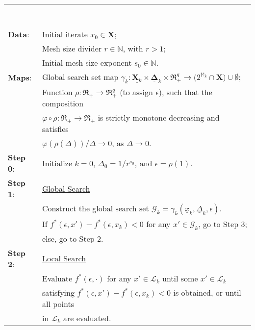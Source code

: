 \noindent
\begin{minipage}[b]{\textwidth}
\begin{algorithm}
~\\
{\em
\begin{tabular}{ll}
\multicolumn{2}{l}{\hspace{\textwidth}~} \\ \\[-8ex]\\
\hline \\[-2ex]
 \textbf{Data}:
     & Initial iterate $x_0 \in \mathbf X$;\\ 
     & Mesh size divider $r \in \mathbb N$, with $r > 1$;\\
     & Initial mesh size exponent $s_0 \in \mathbb N$.\\
 \textbf{Maps}:
     & Global search set map 
       $\gamma_k \colon \underline{\mathbf X_k} 
       \times \underline
       {\boldsymbol \Delta}_k  \times \Re_+^q \to \bigl( 
       2^{\mathbb M_k} \cap \mathbf X \bigr) \cup \emptyset$; \\ 
     & Function $\rho \colon \Re_+ \to \Re_+^q$ (to assign $\epsilon$),
       such that the composition \\
     & $\varphi \circ \rho \colon \Re_+ \to \Re_+$
       is strictly monotone decreasing and satisfies\\
     & $\varphi(\rho(\Delta))/\Delta \to 0$, as $\Delta \to 0$.\\
  \textbf{Step 0}: 
     & Initialize $k=0$, $\Delta_0 = 1 / r^{s_0}$, and $\epsilon=\rho(1)$.\\
  \textbf{Step 1}:
     & \underline{Global Search}\\
     & Construct the global search set
       $\mathcal G_k = \gamma_k(\underline x_k, \underline \Delta_k,
        \epsilon)$.\\
     & If $f^*(\epsilon, x') - f^*(\epsilon, x_k) < 0$
       for any $x' \in \mathcal G_k$, go to Step 3;\\
       & else, go to Step 2.\\
  \textbf{Step 2}:
     & \underline{Local Search}\\
     & Evaluate $f^*(\epsilon, \cdot)$ for any $x' \in \mathcal L_k$ until
       some $x' \in \mathcal L_k$\\
     & satisfying 
       $f^*(\epsilon, x') - f^*(\epsilon, x_k) < 0$
       is obtained, 
       or until all points\\
     & in $\mathcal L_k$ are evaluated.\\

\end{tabular}}
\end{algorithm}
\end{minipage}
